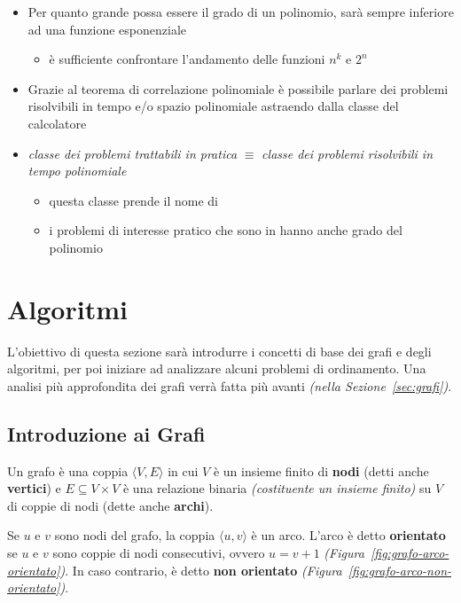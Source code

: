 \documentclass[italian, 10pt]{article}
\begin{document}
\begin{itemize}
  \item Per quanto grande possa essere il grado di un polinomio, sarà sempre inferiore ad una funzione esponenziale
        \begin{itemize}[label=\(\rightarrow\)]
          \item è sufficiente confrontare l'andamento delle funzioni \(n^k\) e \(2^n\)
        \end{itemize}
  \item Grazie al teorema di correlazione polinomiale è possibile parlare dei problemi risolvibili in tempo e/o spazio polinomiale astraendo dalla classe del calcolatore
  \item \textit{classe dei problemi trattabili in pratica} \(\equiv\) \textit{classe dei problemi risolvibili in tempo polinomiale}
        \begin{itemize}
          \item questa classe prende il nome di \Pset
          \item i problemi di interesse pratico che sono in \Pset hanno anche grado del polinomio 
        \end{itemize}
\end{itemize}

\clearpage

\section{Algoritmi}

L'obiettivo di questa sezione sarà introdurre i concetti di base dei grafi e degli algoritmi, per poi iniziare ad analizzare alcuni problemi di ordinamento.
Una analisi più approfondita dei grafi verrà fatta più avanti \textit{(nella Sezione~\ref{sec:grafi})}.

\subsection{Introduzione ai Grafi}

Un grafo è una coppia \(\langle V, E \rangle\) in cui \(V\) è un insieme finito di \textbf{nodi} (detti anche \textbf{vertici}) e \(E \subseteq V \times V\) è una relazione binaria \textit{(costituente un insieme finito)} su \(V\) di coppie di nodi (dette anche \textbf{archi}).

Se \(u\) e \(v\) sono nodi del grafo, la coppia \(\langle u, v \rangle\) è un arco.
L'arco è detto \textbf{orientato} se \(u\) e \(v\) sono coppie di nodi consecutivi, ovvero \(u = v + 1\) \textit{(Figura~\ref{fig:grafo-arco-orientato})}.
In caso contrario, è detto \textbf{non orientato} \textit{(Figura~\ref{fig:grafo-arco-non-orientato})}.
\end{document}
